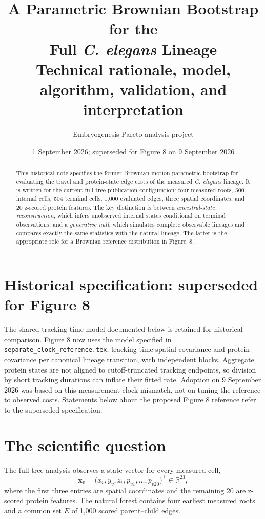 \documentclass[10pt]{article}
\title{\textbf{A Parametric Brownian Bootstrap for the\\
Full \textit{C. elegans} Lineage}\\[2mm]
\large Technical rationale, model, algorithm, validation, and interpretation}
\author{Embryogenesis Pareto analysis project}
\date{1 September 2026; superseded for Figure 8 on 9 September 2026}
\newcommand{\R}{\mathbb{R}}
\begin{document}
\maketitle

\section*{Historical specification: superseded for Figure 8}
The shared-tracking-time model documented below is retained for historical
comparison. Figure 8 now uses the model specified in
\texttt{separate\_clock\_reference.tex}: tracking-time spatial covariance
and protein covariance per canonical lineage transition, with independent
blocks. Aggregate protein states are not aligned to cutoff-truncated tracking
endpoints, so division by short tracking durations can inflate their fitted
rate. Adoption on 9 September 2026 was based on this measurement-clock
mismatch, not on tuning the reference to observed costs. Statements below
about the proposed Figure 8 reference refer to the superseded specification.

\begin{abstract}
This historical note specifies the former Brownian-motion parametric bootstrap for evaluating the
travel and protein-state edge costs of the measured \textit{C. elegans}
lineage.  It is written for the current full-tree publication configuration:
four measured roots, 500 internal cells, 504 terminal cells, 1,000 evaluated
edges, three spatial coordinates, and 20 z-scored protein features.  The key
distinction is between \emph{ancestral-state reconstruction}, which infers
unobserved internal states conditional on terminal observations, and a
\emph{generative null}, which simulates complete observable lineages and
compares exactly the same statistics with the natural lineage.  The latter is
the appropriate role for a Brownian reference distribution in Figure~8.
\end{abstract}

\setcounter{tocdepth}{1}
\tableofcontents
\newpage

\section{The scientific question}

The full-tree analysis observes a state vector for every measured cell,
\[
  \mathbf{x}_v =
  \bigl(x_v,y_v,z_v,p_{v1},\ldots,p_{v20}\bigr)^\top \in \R^{23},
\]
where the first three entries are spatial coordinates and the remaining 20 are
z-scored protein features.  The natural forest contains four earliest measured
roots and a common set $E$ of 1,000 scored parent--child edges.
\end{document}

